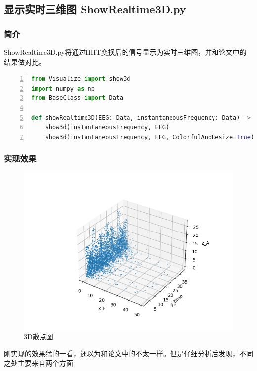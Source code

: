 \documentclass[cs4size,a4paper]{ctexart}
\numberwithin{equation}{section}
\numberwithin{table}{section}
\numberwithin{figure}{section}
\begin{document}
\subsection{显示实时三维图 ShowRealtime3D.py}

\subsubsection{简介}

\colorbox{LetMeFlyGray}{ShowRealtime3D.py}将通过HHT变换后的信号显示为实时三维图，并和论文中的结果做对比。

\begin{lstlisting}[language={python},
numbers=left,
numberstyle=\tiny\monaco,
basicstyle=\footnotesize\monaco]
from Visualize import show3d
import numpy as np
from BaseClass import Data

def showRealtime3D(EEG: Data, instantaneousFrequency: Data) -> None:
    show3d(instantaneousFrequency, EEG)
    show3d(instantaneousFrequency, EEG, ColorfulAndResize=True)
\end{lstlisting}

\subsubsection{实现效果}

\begin{figure}[H]
\small
\centering
\includegraphics{3D.png}
\caption{3D散点图} \label{fig:3D}
\end{figure}

刚实现的效果猛的一看，还以为和论文中的不太一样。但是仔细分析后发现，不同之处主要来自两个方面
\end{document}
